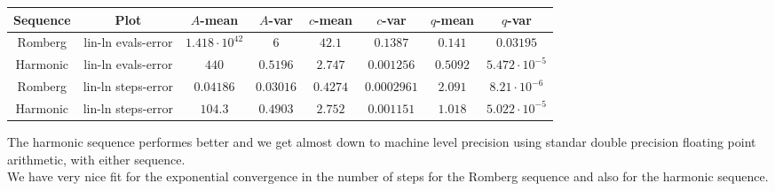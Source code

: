 \begin{table}[H]
    \centering
    \small
     \begin{tabular}{c|c||c|c|c|c|c|c}
Sequence & Plot & \(A\)-mean & \(A\)-var & \(c\)-mean & \(c\)-var & \(q\)-mean & \(q\)-var\\\hline
\rowcolor{red}
Romberg & lin-ln evals-error & \(1.418\cdot 10^{42}\) & \(6\) & \(42.1\) & \(0.1387\) & \(0.141\) & \(0.03195\) \\
\rowcolor{green}
Harmonic & lin-ln evals-error & \(440\) & \(0.5196\) & \(2.747\) & \(0.001256\) & \(0.5092\) & \(5.472\cdot 10^{-5}\) \\
\rowcolor{green}
Romberg & lin-ln steps-error & \(0.04186\) & \(0.03016\) & \(0.4274\) & \(0.0002961\) & \(2.091\) & \(8.21\cdot 10^{-6}\) \\
\rowcolor{green}
Harmonic & lin-ln steps-error & \(104.3\) & \(0.4903\) & \(2.752\) & \(0.001151\) & \(1.018\) & \(5.022\cdot 10^{-5}\) \\
    \end{tabular}
    \label{tab:my_label}
\end{table}

The harmonic sequence performes better and we get almost down to machine level precision using standar double precision floating point arithmetic, with either sequence.\\

We have very nice fit for the exponential convergence in the number of steps for the Romberg sequence and also for the harmonic sequence.

